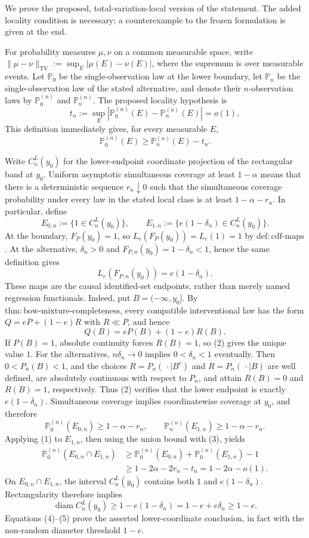 We prove the proposed, total-variation-local version of the statement.  The added locality condition is necessary; a counterexample to the frozen formulation is given at the end.

For probability measures \(\mu,\nu\) on a common measurable space, write \(\|\mu-\nu\|_{\mathrm{TV}}:=\sup_E|\mu(E)-\nu(E)|\), where the supremum is over measurable events.  Let \(\mathbb P_0\) be the single-observation law at the lower boundary, let \(\mathbb P_n\) be the single-observation law of the stated alternative, and denote their \(n\)-observation laws by \(\mathbb P_0^{(n)}\) and \(\mathbb P_n^{(n)}\).  The proposed locality hypothesis is
\[
 t_n:=\sup_E\left|\mathbb P_0^{(n)}(E)-\mathbb P_n^{(n)}(E)\right|=o(1),
\]
This definition immediately gives, for every measurable \(E\),
\[
 \mathbb P_0^{(n)}(E)\geq \mathbb P_n^{(n)}(E)-t_n. \tag{1}
\]

Write \(C_n^L(y_0)\) for the lower-endpoint coordinate projection of the rectangular band at \(y_0\).  Uniform asymptotic simultaneous coverage at least \(1-\alpha\) means that there is a deterministic sequence \(r_n\downarrow0\) such that the simultaneous coverage probability under every law in the stated local class is at least \(1-\alpha-r_n\).  In particular, define
\[
 E_{0,n}:=\{1\in C_n^L(y_0)\},
 \qquad
 E_{1,n}:=\{e(1-\delta_n)\in C_n^L(y_0)\}.
\]
At the boundary, \(F_P(y_0)=1\), so \(L_e(F_P(y_0))=L_e(1)=1\) by \(\mathrm{def:cdf\text{-}maps}\).  At the alternative, \(\delta_n>0\) and \(F_{P,n}(y_0)=1-\delta_n<1\), hence the same definition gives
\[
 L_e(F_{P,n}(y_0))=e(1-\delta_n).
\]
These maps are the causal identified-set endpoints, rather than merely named regression functionals.  Indeed, put \(B=({-}\infty,y_0]\).  By \(\mathrm{thm:bow\text{-}mixture\text{-}completeness}\), every compatible interventional law has the form \(Q=eP+(1-e)R\) with \(R\ll P\), and hence
\[
 Q(B)=eP(B)+(1-e)R(B). \tag{2}
\]
If \(P(B)=1\), absolute continuity forces \(R(B)=1\), so (2) gives the unique value \(1\).  For the alternatives, \(n\delta_n\to0\) implies \(0<\delta_n<1\) eventually.  Then \(0<P_n(B)<1\), and the choices \(R=P_n(\,\cdot\mid B^c)\) and \(R=P_n(\,\cdot\mid B)\) are well defined, are absolutely continuous with respect to \(P_n\), and attain \(R(B)=0\) and \(R(B)=1\), respectively.  Thus (2) verifies that the lower endpoint is exactly \(e(1-\delta_n)\).
Simultaneous coverage implies coordinatewise coverage at \(y_0\), and therefore
\[
 \mathbb P_0^{(n)}(E_{0,n})\geq1-\alpha-r_n,
 \qquad
 \mathbb P_n^{(n)}(E_{1,n})\geq1-\alpha-r_n. \tag{3}
\]
Applying (1) to \(E_{1,n}\), then using the union bound with (3), yields
\[
 \begin{aligned}
 \mathbb P_0^{(n)}(E_{0,n}\cap E_{1,n})
 &\geq \mathbb P_0^{(n)}(E_{0,n})+\mathbb P_0^{(n)}(E_{1,n})-1\\
 &\geq 1-2\alpha-2r_n-t_n
  =1-2\alpha-o(1). \tag{4}
 \end{aligned}
\]
On \(E_{0,n}\cap E_{1,n}\), the interval \(C_n^L(y_0)\) contains both \(1\) and \(e(1-\delta_n)\).  Rectangularity therefore implies
\[
 \operatorname{diam} C_n^L(y_0)
 \geq 1-e(1-\delta_n)
 =1-e+e\delta_n
 \geq1-e. \tag{5}
\]
Equations (4)--(5) prove the asserted lower-coordinate conclusion, in fact with the non-random diameter threshold \(1-e\).


